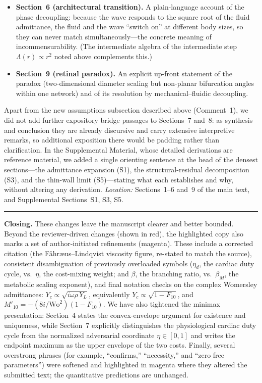 \documentclass[11pt]{article}
\begin{document}
\begin{itemize}[leftmargin=1.4em,itemsep=3pt,topsep=2pt]
        large conduit arteries (area-preserving impedance matching), and the
        interior minimax as the mid-calibre pulsatile beds that morphometry
        actually samples.
  \item \textbf{Section~6 (architectural transition).} A plain-language account
        of the phase decoupling: because the wave responds to the square root of
        the fluid admittance, the fluid and the wave ``switch on'' at different
        body sizes, so they can never match simultaneously---the concrete meaning
        of incommensurability. (The intermediate algebra of the intermediate
        step $\Lambda(r)\propto r^2$ noted above complements this.)
  \item \textbf{Section~9 (retinal paradox).} An explicit up-front statement of
        the paradox (two-dimensional diameter scaling but non-planar bifurcation
        angles within one network) and of its resolution by mechanical--fluidic
        decoupling.
\end{itemize}
Apart from the new assumptions subsection described above (Comment~1),
we did not add further expository bridge passages to Sections~7 and~8: as
synthesis and conclusion they are already discursive and carry extensive
interpretive remarks, so additional exposition there would be padding rather
than clarification. In the
Supplemental Material, whose detailed derivations are reference material, we added
a single orienting sentence at the head of the densest sections---the admittance
expansion (S1), the structural-residual decomposition (S3), and the thin-wall
limit (S5)---stating what each establishes and why, without altering any
derivation. \emph{Location:} Sections~1--6 and~9 of the main text, and
Supplemental Sections~S1, S3, S5.

\bigskip
\hrule
\bigskip
\noindent\textbf{Closing.} These changes leave the manuscript clearer and better
bounded. Beyond the reviewer-driven changes
(shown in red), the highlighted copy also marks a set of author-initiated
refinements (magenta). These include a corrected citation (the
Fåhræus--Lindqvist viscosity figure, re-stated to match the source), consistent
disambiguation of previously overloaded symbols ($\eta_d$, the cardiac duty
cycle, vs.\ $\eta$, the cost-mixing weight; and $\beta$, the branching ratio,
vs.\ $\beta_M$, the metabolic scaling exponent), and final notation checks on
the complex Womersley admittances: $Y_c\propto\sqrt{i\omega\rho\,Y_L}$,
equivalently $Y_c\propto\sqrt{1-F_{10}}$, and
$M'_{10}=-(8i/\mathrm{Wo}^2)(1-F_{10})$. We have also tightened the minimax
presentation: Section~4 states the convex-envelope argument for existence and
uniqueness, while Section~7 explicitly distinguishes the physiological cardiac
duty cycle from the normalized adversarial coordinate $\eta\in[0,1]$ and writes
the endpoint maximum as the upper envelope of the two costs. Finally, several
overstrong phrases (for example, ``confirms,'' ``necessity,'' and ``zero free
parameters'') were softened and highlighted in magenta where they altered the
submitted text; the quantitative predictions are unchanged.
\end{document}
